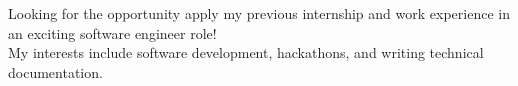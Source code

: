 

\begin{cvparagraph}
Looking for the opportunity apply my previous internship and work experience in an exciting software engineer role!
\\My interests include software development, hackathons, and writing technical documentation.
\end{cvparagraph}
